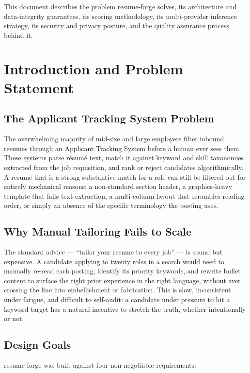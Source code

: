 \documentclass[10.5pt,letterpaper]{article}
\begin{document}
This document describes the problem resume-forge solves, its architecture and data-integrity
guarantees, its scoring methodology, its multi-provider inference strategy, its security and
privacy posture, and the quality assurance process behind it.

\newpage

\section{Introduction and Problem Statement}

\subsection{The Applicant Tracking System Problem}
The overwhelming majority of mid-size and large employers filter inbound resumes through an
Applicant Tracking System before a human ever sees them. These systems parse résumé text,
match it against keyword and skill taxonomies extracted from the job requisition, and rank or
reject candidates algorithmically. A resume that is a strong substantive match for a role can
still be filtered out for entirely mechanical reasons: a non-standard section header, a
graphics-heavy template that fails text extraction, a multi-column layout that scrambles
reading order, or simply an absence of the specific terminology the posting uses.

\subsection{Why Manual Tailoring Fails to Scale}
The standard advice --- ``tailor your resume to every job'' --- is sound but expensive. A
candidate applying to twenty roles in a search would need to manually re-read each posting,
identify its priority keywords, and rewrite bullet content to surface the right prior
experience in the right language, without ever crossing the line into embellishment or
fabrication. This is slow, inconsistent under fatigue, and difficult to self-audit: a
candidate under pressure to hit a keyword target has a natural incentive to stretch the truth,
whether intentionally or not.

\subsection{Design Goals}
resume-forge was built against four non-negotiable requirements:
\end{document}
